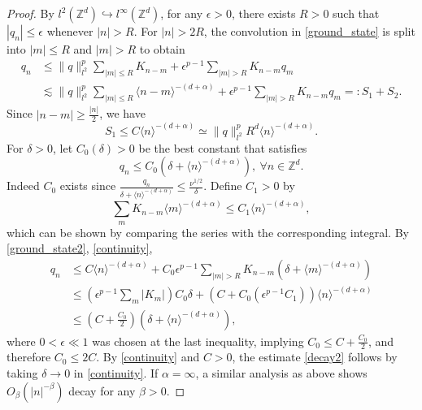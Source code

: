 \documentclass[10pt,a4paper]{amsart}
\begin{document}
\begin{proof}
By $l^2(\mathbb{Z}^d) \hookrightarrow l^\infty(\mathbb{Z}^d)$, for any $\epsilon > 0$, there exists $R>0$ such that $|q_n| \leq \epsilon$ whenever $|n| > R$. For $|n| > 2R$, the convolution in \eqref{ground_state} is split into $|m| \leq R$ and $|m| > R$ to obtain
\begin{equation}\label{ground_state2}
\begin{split}
    q_n &\leq \| q \|_{l^2}^p \sum_{|m| \leq R} K_{n-m} + \epsilon^{p-1}\sum_{|m| > R} K_{n-m} q_m\\
    &\lesssim \| q \|_{l^2}^p\sum_{|m| \leq R} \langle n-m \rangle^{-(d+\alpha)}+ \epsilon^{p-1}\sum_{|m| > R} K_{n-m} q_m =: S_1 + S_2.
\end{split}
\end{equation}
Since $|n-m| \geq \frac{|n|}{2}$, we have
\begin{equation*}
S_1 \leq C  \langle n \rangle^{-(d+\alpha)} \simeq \| q \|_{l^2}^p R^d \langle n \rangle^{-(d+\alpha)}.   
\end{equation*}
For $\delta > 0$, let $C_0(\delta) > 0$ be the best constant that satisfies
\begin{equation}\label{continuity}
    q_n \leq C_0(\delta + \langle n \rangle^{-(d+\alpha)}),\ \forall n \in \mathbb{Z}^d.
\end{equation}
Indeed $C_0$ exists since $\frac{q_n}{\delta + \langle n \rangle^{-(d+\alpha)}} \leq \frac{\nu^{1/2}}{\delta}$. Define $C_1 > 0$ by
\begin{equation*}
\sum\limits_{m} K_{n-m} \langle m \rangle^{-(d+\alpha)} \leq C_1 \langle n \rangle^{-(d+\alpha)},    
\end{equation*}
which can be shown by comparing the series with the corresponding integral. By \eqref{ground_state2}, \eqref{continuity},
\begin{equation*}
\begin{split}
    q_n &\leq C \langle n \rangle^{-(d+\alpha)} + C_0 \epsilon^{p-1} \sum_{|m| > R} K_{n-m} (\delta + \langle m \rangle^{-(d+\alpha)})\\
    &\leq (\epsilon^{p-1}\sum_{m} |K_{m}|) C_0\delta +  (C + C_0 (\epsilon^{p-1}C_1))\langle n \rangle^{-(d+\alpha)}\\
    &\leq (C + \frac{C_0}{2})(\delta + \langle n \rangle^{-(d+\alpha)}),
\end{split}
\end{equation*}
where $0 < \epsilon \ll 1$ was chosen at the last inequality, implying $C_0 \leq C + \frac{C_0}{2}$, and therefore $C_0 \leq 2C$. By \eqref{continuity} and $C>0$, the estimate \eqref{decay2} follows by taking $\delta \rightarrow 0$ in \eqref{continuity}. If $\alpha = \infty$, a similar analysis as above shows $O_{\beta}(|n|^{-\beta})$ decay for any $\beta > 0$.


\end{proof}
\end{document}

